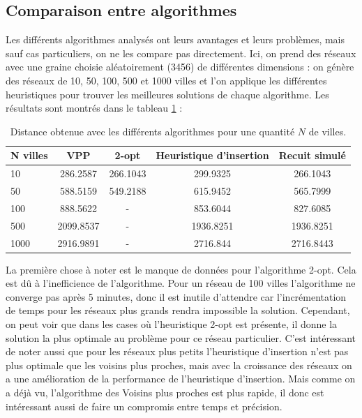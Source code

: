 \documentclass[a4paper,11pt,fleqn]{article}
\begin{document}
\subsection*{Comparaison entre algorithmes}
Les différents algorithmes analysés ont leurs avantages et leurs problèmes, mais sauf cas particuliers, on ne les compare pas directement. Ici, on prend des réseaux avec une graine choisie aléatoirement (3456) de différentes dimensions : on génère des réseaux de 10, 50, 100, 500 et 1000 villes et l'on applique les différentes heuristiques pour trouver les meilleures solutions de chaque algorithme. Les résultats sont montrés dans le tableau \ref{tab:distances} : 
\begin{table}[H]
    \centering
    \caption{Distance obtenue avec les différents algorithmes pour une quantité $N$ de villes.}
    \label{tab:distances}
    \begin{tabular}{lcccc}
        \hline
        N villes & VPP & 2-opt & Heuristique d'insertion & Recuit simulé \\ \hline\hline
        10  & 286.2587  & 266.1043  & 299.9325 & 266.1043 \\
        50  & 588.5159  & 549.2188  & 615.9452 & 565.7999 \\
        100 & 888.5622 & - & 853.6044 & 827.6085 \\
        500 & 2099.8537 & - & 1936.8251 & 1936.8251 \\
        1000 & 2916.9891 & - & 2716.844 & 2716.8443  \\ \hline
    \end{tabular}
\end{table}

La première chose à noter est le manque de données pour l'algorithme 2-opt. Cela est dû à l'inefficience de l’algorithme. Pour un réseau de 100 villes l'algorithme ne converge pas après 5 minutes, donc il est inutile d'attendre car l’incrémentation de temps pour les réseaux plus grands rendra impossible la solution. Cependant, on peut voir que dans les cases où l'heuristique 2-opt est présente, il donne la solution la plus optimale au problème pour ce réseau particulier. C'est intéressant de noter aussi que pour les réseaux plus petits l'heuristique d'insertion n'est pas plus optimale que les voisins plus proches, mais avec la croissance des réseaux on a une amélioration de la performance de l'heuristique d'insertion. Mais comme on a déjà vu, l'algorithme des Voisins plus proches est plus rapide, il donc est intéressant aussi de faire un compromis entre temps et précision.
\end{document}
